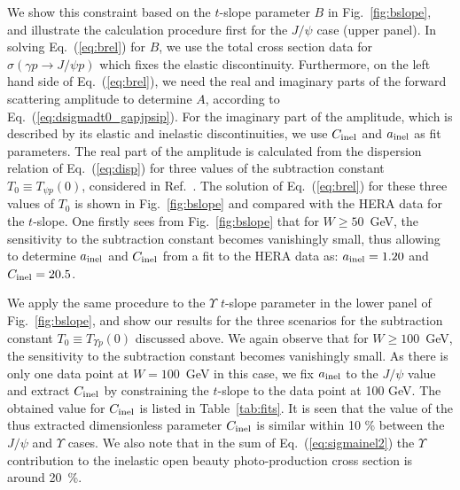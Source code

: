 \documentclass[prd,amsmath,twocolumn,floatfix,amssymb, preprintnumbers, linenumbers,nofootinbib, superscriptaddress]{revtex4}
\begin{document}
We show this constraint based on the $t$-slope parameter $B$ in Fig.~\ref{fig:bslope}, and illustrate the calculation procedure first for the $J/\psi$ case (upper panel).
In solving Eq.~(\ref{eq:brel}) for $B$, we use the total cross section data for $\sigma(\gamma p \to J/\psi p)$ which fixes the elastic discontinuity. Furthermore, on the left hand side of Eq.~(\ref{eq:brel}), we need the real and imaginary parts of the forward scattering amplitude to determine $A$, according to Eq.~(\ref{eq:dsigmadt0_gapjpsip}). 
For the imaginary part of the amplitude, which is described by its elastic and inelastic discontinuities, we use $C_{\rm inel}$ and $a_{\rm inel}$ as fit parameters.   
The real part of the amplitude is calculated from the dispersion relation of Eq.~(\ref{eq:disp}) for three values of the subtraction constant $T_0 \equiv T_{\psi p}(0)$, considered in Ref.~\cite{Gryniuk:2016mpk}. The solution of Eq.~(\ref{eq:brel}) for these three values of $T_0$ is shown in Fig.~\ref{fig:bslope} and compared with the HERA data for the $t$-slope. One firstly sees from Fig.~\ref{fig:bslope} that for $W \geq 50$~GeV, the sensitivity to the subtraction constant becomes vanishingly small, thus allowing to determine $a_{\rm inel}$ and $C_{\rm inel}$ from a fit to the HERA data as: $a_{\rm inel} = 1.20$ and 
$C_{\rm inel} = 20.5$. 


We apply the same procedure to the $\Upsilon$ $t$-slope parameter in the lower panel of Fig.~\ref{fig:bslope}, and  show our results for the three scenarios for the subtraction constant $T_0 \equiv T_{\Upsilon p}(0)$ discussed above. We again observe that for $W \geq 100$~GeV, the sensitivity to the subtraction constant becomes vanishingly small. 
As there is only one data point at $W = 100$~GeV in this case, we fix $a_{\rm inel}$ to the $J/\psi$ value and extract $C_{\rm inel}$ by constraining the $t$-slope to the data point at 100 GeV. The obtained value for $C_{\rm inel}$ is listed in Table~\ref{tab:fits}. It is seen that the value of the thus extracted dimensionless parameter $C_{\rm inel}$ is similar within 10 \% between the $J/\psi$ and $\Upsilon$ cases. We also note that in the sum of Eq.~(\ref{eq:sigmainel2}) the $\Upsilon$ contribution  to the inelastic open beauty photo-production cross section is around 20~\%. 
\end{document}
